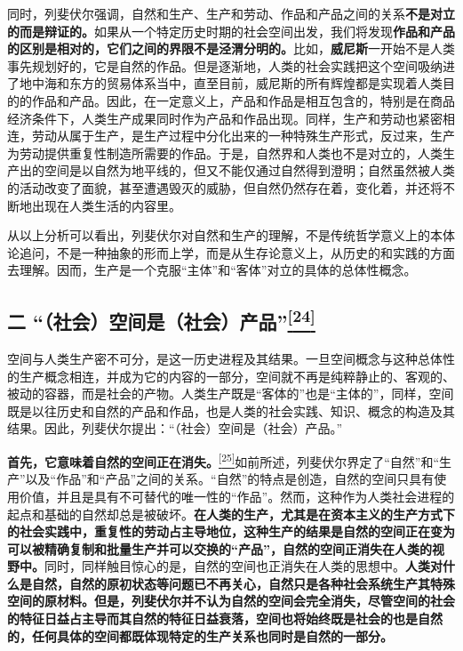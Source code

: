 \documentclass[UTF8, fontset = sourcesans, a4paper, oneside, zihao =
-4, scheme=chinese, no-math, space=true]{ctexbook}
\begin{document}
同时，列斐伏尔强调，自然和生产、生产和劳动、作品和产品之间的关系\textbf{不是对立的而是辩证的。}如果从一个特定历史时期的社会空间出发，我们将发现\textbf{作品和产品的区别是相对的，它们之间的界限不是泾渭分明的。}比如，\textbf{威尼斯}一开始不是人类事先规划好的，它是自然的作品。但是逐渐地，人类的社会实践把这个空间吸纳进了地中海和东方的贸易体系当中，直至目前，威尼斯的所有辉煌都是实现着人类目的的作品和产品。因此，在一定意义上，产品和作品是相互包含的，特别是在商品经济条件下，人类生产成果同时作为产品和作品出现。同样，生产和劳动也紧密相连，劳动从属于生产，是生产过程中分化出来的一种特殊生产形式，反过来，生产为劳动提供重复性制造所需要的作品。于是，自然界和人类也不是对立的，人类生产出的空间是以自然为地平线的，但又不能仅通过自然得到澄明；自然虽然被人类的活动改变了面貌，甚至遭遇毁灭的威胁，但自然仍然存在着，变化着，并还将不断地出现在人类生活的内容里。

从以上分析可以看出，列斐伏尔对自然和生产的理解，不是传统哲学意义上的本体论追问，不是一种抽象的形而上学，而是从生存论意义上，从历史的和实践的方面去理解。因而，生产是一个克服``主体''和``客体''对立的具体的总体性概念。

\subsection[二
``（社会）空间是（社会）产品''\protect\hyperlink{part0006_split_003.htmlux5cux23m24}{\textsuperscript{{[}24{]}}}]{\texorpdfstring{二
``（社会）空间是（社会）产品''\protect\hypertarget{part0006_split_002.htmlux5cux23w24}{}{}\protect\hyperlink{part0006_split_003.htmlux5cux23m24}{\textsuperscript{{[}24{]}}}}{二 （社会）空间是（社会）产品{[}24{]}}}\label{part0006_split_002.htmlux5cux23c017}

空间与人类生产密不可分，是这一历史进程及其结果。一旦空间概念与这种总体性的生产概念相连，并成为它的内容的一部分，空间就不再是纯粹静止的、客观的、被动的容器，而是社会的产物。人类生产既是``客体的''也是``主体的''，同样，空间既是以往历史和自然的产品和作品，也是人类的社会实践、知识、概念的构造及其结果。因此，列斐伏尔提出：``（社会）空间是（社会）产品。''

\textbf{首先，它意味着自然的空间正在消失。}\protect\hypertarget{part0006_split_002.htmlux5cux23w25}{}{}\protect\hyperlink{part0006_split_003.htmlux5cux23m25}{\textsuperscript{{[}25{]}}}如前所述，列斐伏尔界定了``自然''和``生产''以及``作品''和``产品''之间的关系。``自然''的特点是创造，自然的空间只具有使用价值，并且是具有不可替代的唯一性的``作品''。然而，这种作为人类社会进程的起点和基础的自然却总是被破坏。\textbf{在人类的生产，尤其是在资本主义的生产方式下的社会实践中，重复性的劳动占主导地位，这种生产的结果是自然的空间正在变为可以被精确复制和批量生产并可以交换的``产品''，自然的空间正消失在人类的视野中。}同时，同样触目惊心的是，自然的空间也正消失在人类的思想中。\textbf{人类对什么是自然，自然的原初状态等问题已不再关心，自然只是各种社会系统生产其特殊空间的原材料。但是，列斐伏尔并不认为自然的空间会完全消失，尽管空间的社会的特征日益占主导而其自然的特征日益衰落，空间也将始终既是社会的也是自然的，任何具体的空间都既体现特定的生产关系也同时是自然的一部分。}
\end{document}
